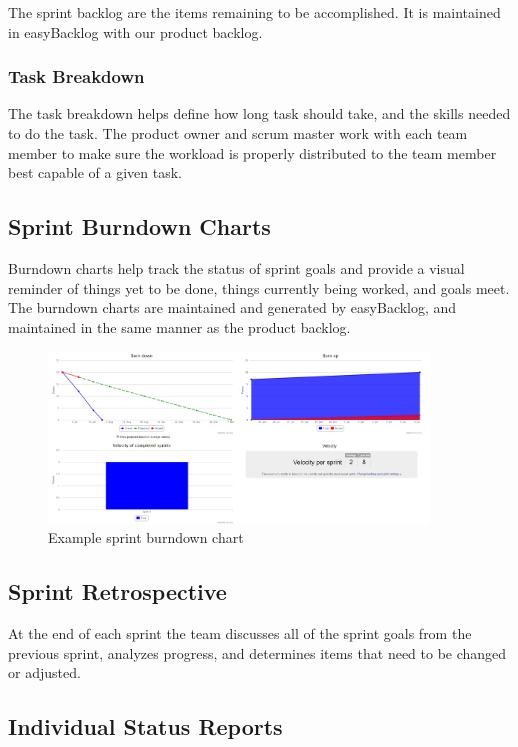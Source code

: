 The sprint backlog are the items remaining to be accomplished. It is maintained in easyBacklog with our product backlog.

\subsubsection{Task Breakdown}

The task breakdown helps define how long task should take, and the skills needed to do the task. The product owner and scrum master work with each team member to make sure the workload is properly distributed to the team member best capable of a given task.

\subsection{Sprint Burndown Charts}

Burndown charts help track the status of sprint goals and provide a visual reminder of things yet to be done, things currently being worked, and goals meet. The burndown charts are maintained and generated by easyBacklog, and maintained in the same manner as the product backlog.

\begin{figure}[h!]
    \centering
    \includegraphics[width=0.9\textwidth]{images/Burndown_Sprint1}
    \caption{Example sprint burndown chart}
\end{figure}

\subsection{Sprint Retrospective}

At the end of each sprint the team discusses all of the sprint goals from the previous sprint, analyzes progress, and determines items that need to be changed or adjusted.

\subsection{Individual Status Reports}

